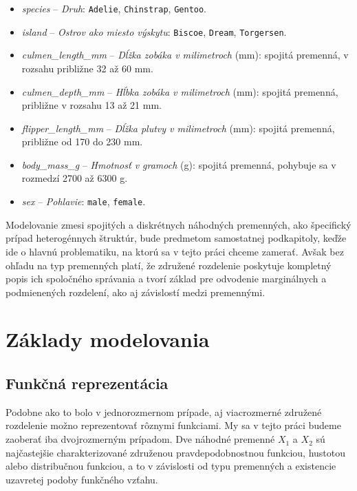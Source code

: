 \begin{itemize}
  \item \textit{species} – \textit{Druh}: \texttt{Adelie}, \texttt{Chinstrap}, \texttt{Gentoo}.
  \item \textit{island} – \textit{Ostrov ako miesto výskytu}: \texttt{Biscoe}, \texttt{Dream}, \texttt{Torgersen}.
  \item \textit{culmen\_length\_mm} – \textit{Dĺžka zobáka v milimetroch} (mm): spojitá premenná, v rozsahu približne 32 až 60 mm.
  \item \textit{culmen\_depth\_mm} – \textit{Hĺbka zobáka v milimetroch} (mm): spojitá premenná, približne v rozsahu 13 až 21 mm.
  \item \textit{flipper\_length\_mm} – \textit{Dĺžka plutvy v milimetroch} (mm): spojitá premenná, približne od 170 do 230 mm.
  \item \textit{body\_mass\_g} – \textit{Hmotnosť v gramoch} (g): spojitá premenná, pohybuje sa v rozmedzí 2700 až 6300 g.
  \item \textit{sex} – \textit{Pohlavie}: \texttt{male}, \texttt{female}.
\end{itemize}

Modelovanie zmesi spojitých a diskrétnych náhodných premenných, ako špecifický prípad heterogénnych štruktúr, bude predmetom samostatnej podkapitoly, keďže ide o hlavnú problematiku, na ktorú sa v tejto práci chceme zamerať. Avšak bez ohľadu na typ premenných platí, že združené rozdelenie poskytuje kompletný popis ich spoločného správania a tvorí základ pre odvodenie marginálnych a podmienených rozdelení, ako aj závislostí medzi premennými.


\section{Základy modelovania}\label{sec:joint_zaklady_modelovania}

\subsection{Funkčná reprezentácia}\label{subsec:joint_representation}

Podobne ako to bolo v jednorozmernom prípade, aj viacrozmerné združené rozdelenie možno reprezentovať rôznymi funkciami. My sa v tejto práci budeme zaoberať iba dvojrozmerným prípadom. Dve náhodné premenné $X_1$ a $X_2$ sú najčastejšie charakterizované združenou pravdepodobnostnou funkciou, hustotou alebo distribučnou funkciou, a to v závislosti od typu premenných a existencie uzavretej podoby funkčného vzťahu.

